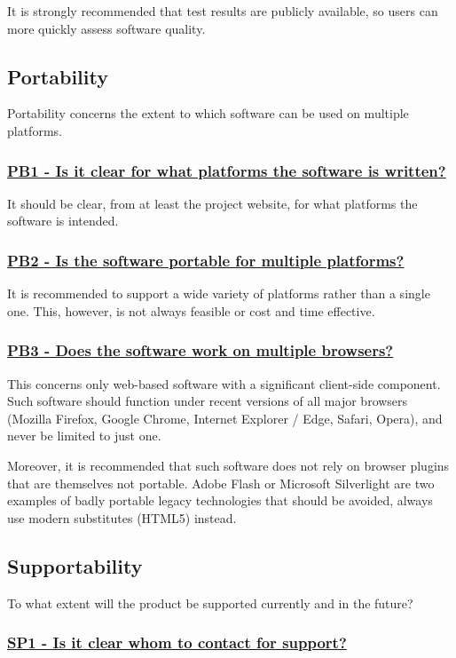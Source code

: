 \documentclass[a4paper,11pt]{article}
\newcommand{\criterion}[2]{\subsubsection*{\underline{#1 - #2}}\label{id:#1}}
\newcommand\CheckTable{%
  \begin{tabular}{ccccc}
    No & Minimal & Adequate & Good & Perfect \\
    0 & 1 & 2 & 3 & 4 \\
    \hline
    $\square$ & $\square$ & $\square$ & $\square$ & $\square$ \\
  \end{tabular}%
}
\begin{document}
It is strongly recommended that test results are publicly available, so users
can more quickly assess software quality.

\subsection{Portability}\label{sec:por}

Portability concerns the extent to which software can be used on multiple
platforms. 

\newcommand{\pbOneID}{PB1}
\newcommand{\pbOneText}{Is it clear for what platforms the software is written?}
\criterion{\pbOneID}{\pbOneText}

It should be clear, from at least the project website, for what platforms the software
is intended.


\newcommand{\pbTwoID}{PB2}
\newcommand{\pbTwoText}{Is the software portable for multiple platforms?}
\criterion{\pbTwoID}{\pbTwoText}

It is recommended to support a wide variety of platforms rather than a single
one. This, however, is not always feasible or cost and time effective.


\newcommand{\pbThreeID}{PB3}
\newcommand{\pbThreeText}{Does the software work on multiple browsers?}
\criterion{\pbThreeID}{\pbThreeText}

This concerns only web-based software with a significant client-side component.
Such software should function under recent versions of all major browsers
(Mozilla Firefox, Google Chrome, Internet Explorer / Edge, Safari, Opera), and
never be limited to just one.

Moreover, it is recommended that such software does not rely on browser plugins that
are themselves not portable. Adobe Flash or Microsoft Silverlight are two
examples of badly portable legacy technologies that should be avoided, always use
modern substitutes (HTML5) instead.


\subsection{Supportability}\label{sec:sup}

To what extent will the product be supported currently and in the future?

\newcommand{\spOneID}{SP1}
\newcommand{\spOneText}{Is it clear whom to contact for support?}
\criterion{\spOneID}{\spOneText}
\end{document}
